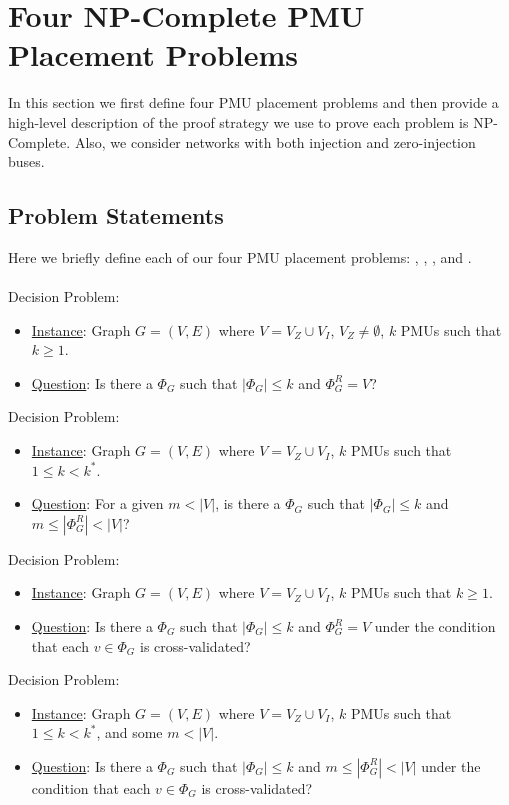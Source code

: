 \section{Four NP-Complete PMU Placement Problems}
\label{sec:problem-analysis}

In this section we first define four PMU placement problems and then provide a high-level description of the proof strategy we use to prove each problem is NP-Complete.
Also, we consider networks with both injection and zero-injection buses.


\subsection{Problem Statements}

Here we briefly define each of our four PMU placement problems: \fulls, \maxinc, \xvalparts, and \xvals. \\ \\
\full Decision Problem:
\begin{itemize}
	\item \underline{Instance}: Graph $G=(V,E)$ where $V=V_Z \cup V_I$, $V_Z \neq \emptyset$, $k$ PMUs such that $k \geq 1$.
	\item \underline{Question}: Is there a $\Phi_G$ such that $|\Phi_G| \leq k$ and $\Phi^R_G = V$?
\end{itemize}
\maxinc Decision Problem:
\begin{itemize}
	\item \underline{Instance}: Graph $G=(V,E)$ where $V=V_Z \cup V_I$, $k$ PMUs such that $1 \leq k < k^*$.

	\item \underline{Question}: For a given $m< |V|$, is there a $\Phi_G$ such that $|\Phi_G| \leq k$ and $m \leq |\Phi^R_G| < |V|$?
\end{itemize}
\xval Decision Problem:
\begin{itemize}
	\item \underline{Instance}: Graph $G=(V,E)$ where $V=V_Z \cup V_I$, $k$ PMUs such that $k \geq 1$.

	\item \underline{Question}: Is there a $\Phi_G$ such that $|\Phi_G| \leq k$ and $\Phi^R_G = V$ under the condition that each $v \in \Phi_G$ is cross-validated?
\end{itemize}
\xvalpart Decision Problem:
\begin{itemize}
	\item \underline{Instance}: Graph $G=(V,E)$ where $V=V_Z \cup V_I$, $k$ PMUs such that $1 \leq k < k^*$, and some $m<|V|$.

	\item \underline{Question}: Is there a $\Phi_G$ such that $|\Phi_G| \leq k$ and $m \leq|\Phi^R_G| < |V|$ under the condition that each $v \in \Phi_G$ is cross-validated?
\end{itemize}



